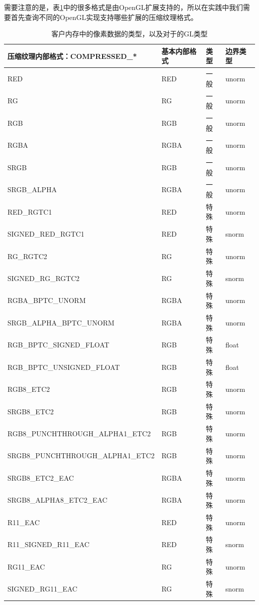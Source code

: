需要注意的是，表\ref{t:api-compression-internal-format}中的很多格式是由OpenGL扩展支持的，所以在实践中我们需要首先查询不同的OpenGL实现支持哪些扩展的压缩纹理格式。


\begin{table}
\caption{客户内存中的像素数据的类型，以及对于的GL类型}
\label{t:api-compression-internal-format}
\centering
\begin{tabular}{>{\small}p{}|>{\small}p{}|>{\small}p{}|>{\small}p{}}
\hline 
   压缩纹理内部格式：COMPRESSED\_* & 基本内部格式 & 类型 & 边界类型\\
    \hline  
    RED                         &  RED   &  一般   &unorm\\
    RG                          &  RG    &  一般   &unorm\\
    RGB                         &  RGB   &  一般   &unorm\\
    RGBA                        &  RGBA  &  一般   &unorm\\
    SRGB                        &  RGB   &  一般   &unorm\\
    SRGB\_ALPHA                 &  RGBA  &  一般   &unorm\\
    RED\_RGTC1                  &  RED   &  特殊   &unorm\\
    SIGNED\_RED\_RGTC1          &  RED   &  特殊   &snorm\\
    RG\_RGTC2                   &  RG    &  特殊   &unorm\\
    SIGNED\_RG\_RGTC2           &  RG    &  特殊   &snorm\\
    RGBA\_BPTC\_UNORM           &  RGBA  &  特殊   &unorm\\
    SRGB\_ALPHA\_BPTC\_UNORM    &  RGBA  &  特殊   &unorm\\
    
    RGB\_BPTC\_SIGNED\_FLOAT    &  RGB   &  特殊   &float\\
    RGB\_BPTC\_UNSIGNED\_FLOAT  &  RGB   &  特殊   &float\\
    RGB8\_ETC2                  &  RGB   &  特殊   &unorm\\
    SRGB8\_ETC2                 &  RGB   &  特殊   &unorm\\
    RGB8\_PUNCHTHROUGH\_ALPHA1\_ETC2  &  RGB  &  特殊   &unorm\\
    SRGB8\_PUNCHTHROUGH\_ALPHA1\_ETC2 &  RGB  &  特殊   &unorm\\
    SRGB8\_ETC2\_EAC            &  RGBA  &  特殊   &unorm\\
    SRGB8\_ALPHA8\_ETC2\_EAC    &  RGBA  &  特殊   &unorm\\
    R11\_EAC                    &  RED   &  特殊   &unorm\\
    R11\_SIGNED\_R11\_EAC       &  RED   &  特殊   &snorm\\
    RG11\_EAC                   &  RG    &  特殊   &unorm\\
    SIGNED\_RG11\_EAC           &  RG    &  特殊   &snorm\\

 \hline 
\end{tabular}
\end{table}

